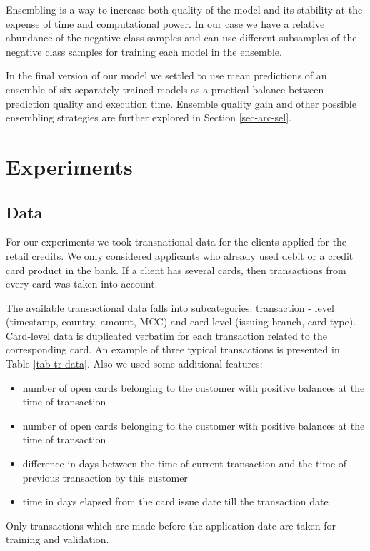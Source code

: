 \documentclass[sigconf]{acmart}
\begin{document}
Ensembling \cite{breiman1996bagging} is a way to increase both quality of the model and its stability at the expense of time and computational power. In our case we have a relative abundance of the negative class samples and can use different subsamples of the negative class samples for training each model in the ensemble.

In the final version of our model we settled to use mean predictions of an ensemble of six separately trained models as a practical balance between prediction quality and execution time. Ensemble quality gain and other possible ensembling strategies are further explored in Section \ref{sec-arc-sel}.

\section{Experiments} \label{sec-exp}
\subsection{Data} \label{sec-data}

For our experiments we took transnational data for the clients applied for the retail credits. We only considered applicants who already used debit or a credit card product in the bank. If a client has several cards, then transactions from every card was taken into account.

The available transactional data falls into subcategories: transaction - level (timestamp, country, amount, MCC) and card-level (issuing branch, card type). Card-level data is duplicated verbatim for each transaction related to the corresponding card. An example of three typical transactions is presented in Table \ref{tab-tr-data}. 
Also we used  some additional features:
\begin{itemize}
\item number of open cards belonging to the customer with positive balances at the time of transaction
\item number of open cards belonging to the customer with positive balances at the time of transaction 
\item difference in days between the time of current transaction and the time of previous transaction by this customer
\item time in days elapsed from the card issue date till the transaction date
\end{itemize}
Only transactions which are made before the application date are taken for training and validation.
\end{document}
